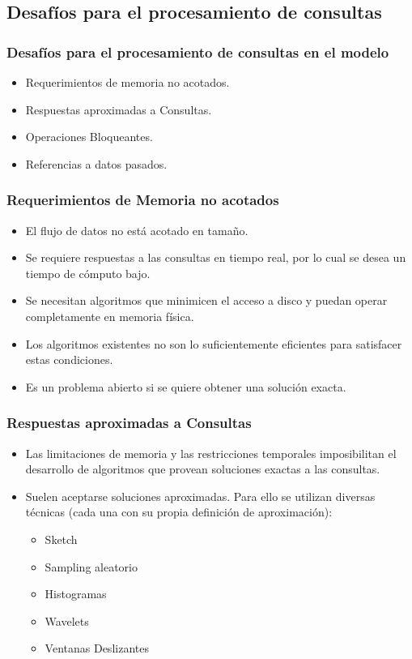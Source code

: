 \subsection{Desafíos para el procesamiento de consultas}
\begin{frame}
\frametitle{Desafíos para el procesamiento de consultas en el modelo}
\begin{itemize}
\item Requerimientos de memoria no acotados.
\item Respuestas aproximadas a Consultas.
\item Operaciones Bloqueantes.
\item Referencias a datos pasados.
\end{itemize}
\end{frame}



\begin{frame}
\frametitle{Requerimientos de Memoria no acotados}
\begin{itemize}
\item El flujo de datos no está acotado en tamaño.
\item Se requiere respuestas a las consultas en tiempo real, por lo cual se desea un tiempo de cómputo bajo.
\item Se necesitan algoritmos que minimicen el acceso a disco y puedan operar completamente en memoria física.
\item Los algoritmos existentes no son lo suficientemente eficientes para satisfacer estas condiciones.
\item Es un problema abierto si se quiere obtener una solución exacta.
\end{itemize}
\end{frame}

\begin{frame}
\frametitle{Respuestas aproximadas a Consultas}
\begin{itemize}
\item Las limitaciones de memoria y las restricciones temporales imposibilitan el desarrollo de algoritmos que provean soluciones exactas a las consultas.
\item Suelen aceptarse soluciones aproximadas. Para ello se utilizan diversas técnicas (cada una con su propia definición de aproximación):
\begin{itemize}
\item Sketch
\item Sampling aleatorio
\item Histogramas
\item Wavelets
\item Ventanas Deslizantes
\end{itemize}
\end{itemize}
\end{frame}

